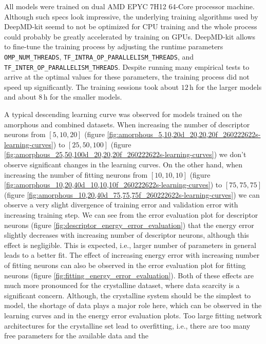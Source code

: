 All models were trained on dual AMD EPYC 7H12 64-Core processor machine.
Although such specs look impressive, the underlying training algorithms used
by DeepMD-kit seemd to not be optimized for CPU training and the whole process
could probably be greatly accelerated by training on GPUs. DeepMD-kit allows
to fine-tune the training process by adjusting the runtime parameters
\texttt{OMP\_NUM\_THREADS}, \texttt{TF\_INTRA\_OP\_PARALLELISM\_THREADS},
and \texttt{TF\_INTER\_OP\_PARALLELISM\_\allowbreak{}THREADS}. Despite running
many empirical tests to arrive at the optimal values for these parameters, the
training process did not speed up significantly. The training sessions took
about $12 \, \mathrm{h}$ for the larger models and about $8 \, \mathrm{h}$ for
the smaller models.

A typical descending learning curve was observed for models trained on the
amorphous and combined datasets. When increasing the number of descriptor
neurons from $[5, 10, 20]$ (figure
\ref{fig:amorphous_5,10,20d_20,20,20f_260222622s-learning-curves}) to
$[25, 50, 100]$ (figure
\ref{fig:amorphous_25,50,100d_20,20,20f_260222622s-learning-curves}) we don't
observe significant changes in the learning curves. On the other hand, when
increasing the number of fitting neurons from $[10, 10, 10]$
(figure \ref{fig:amorphous_10,20,40d_10,10,10f_260222622s-learning-curves}) to
$[75, 75, 75]$ (figure
\ref{fig:amorphous_10,20,40d_75,75,75f_260222622s-learning-curves}) we can
observe a very slight divergence of training error and validation error with
increasing training step. We can see from the error evaluation plot for
descriptor neurons (figure \ref{fig:descriptor_energy_error_evaluation}) that
the energy error slightly decreases with increasing number of descriptor
neurons, although this effect is negligible. This is expected, i.e., larger
number of parameters in general leads to a better fit. The effect of
increasing energy error with increasing number of fitting neurons can also be
observed in the error evaluation plot for fitting neurons (figure
\ref{fig:fitting_energy_error_evaluation}). Both of these effects are much
more pronounced for the crystalline dataset, where data scarcity is a
significant concern. Although, the crystalline system should be the simplest
to model, the shortage of data plays a major role here, which can be observed
in the learning curves and in the energy error evaluation plots. Too large
fitting network architectures for the crystalline set lead to overfitting,
i.e., there are too many free parameters for the available data and the
